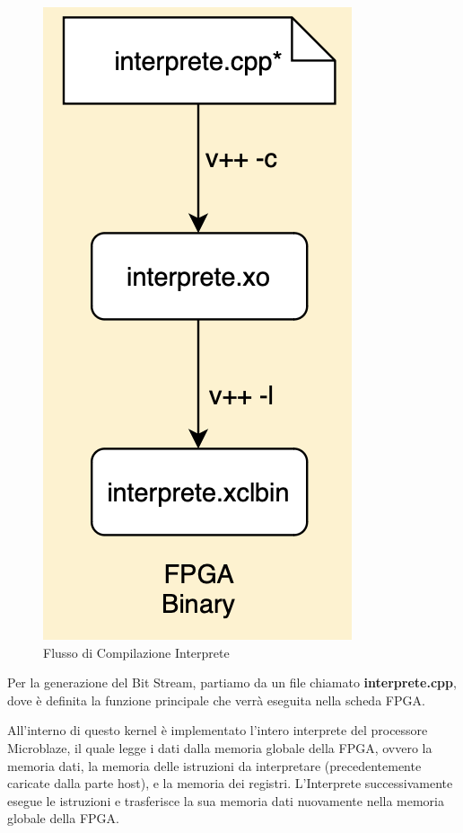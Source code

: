 \begin{figure}[h!]
    \centering
    \includegraphics[scale=0.5]{images/Capitolo3/2_im.png}
    \caption{Flusso di Compilazione Interprete}
    \label{funzionamentoOpenCL}
\end{figure}

\noindent Per la generazione del Bit Stream, partiamo da un file chiamato \textbf{interprete.cpp}, dove è definita la funzione principale che verrà eseguita nella scheda FPGA.

All'interno di questo kernel è implementato l'intero interprete del processore Microblaze, il quale legge i dati dalla memoria globale della FPGA, ovvero la memoria dati, la memoria delle istruzioni da interpretare (precedentemente caricate dalla parte host), e la memoria dei registri.
L'Interprete successivamente esegue le istruzioni e trasferisce la sua memoria dati nuovamente nella memoria globale della FPGA.

